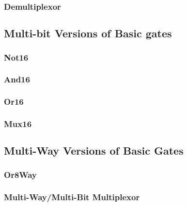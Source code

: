\documentclass[11pt]{article}
\begin{document}
    \hypertarget{demultiplexor}{%
\subsubsection{Demultiplexor}\label{demultiplexor}}

    \hypertarget{multi-bit-versions-of-basic-gates}{%
\subsection{Multi-bit Versions of Basic
gates}\label{multi-bit-versions-of-basic-gates}}

    \hypertarget{not16}{%
\subsubsection{Not16}\label{not16}}

    \hypertarget{and16}{%
\subsubsection{And16}\label{and16}}

    \hypertarget{or16}{%
\subsubsection{Or16}\label{or16}}

    \hypertarget{mux16}{%
\subsubsection{Mux16}\label{mux16}}

    \hypertarget{multi-way-versions-of-basic-gates}{%
\subsection{Multi-Way Versions of Basic
Gates}\label{multi-way-versions-of-basic-gates}}

    \hypertarget{or8way}{%
\subsubsection{Or8Way}\label{or8way}}

    \hypertarget{multi-waymulti-bit-multiplexor}{%
\subsubsection{Multi-Way/Multi-Bit
Multiplexor}\label{multi-waymulti-bit-multiplexor}}
\end{document}
